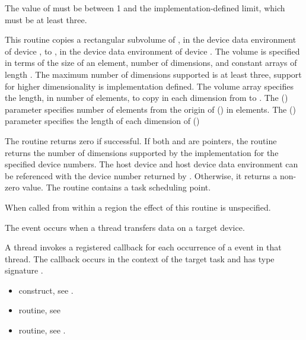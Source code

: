 \begin{ccppspecific}
The value of  must be between 1 and the implementation-defined
limit, which must be at least three.


\effect
This routine copies a rectangular subvolume of ,
in the device data environment of device ,
to , in the device data environment of device .
The volume is specified in terms of the size of an element,
number of dimensions, and constant arrays of length .  The
maximum number of dimensions supported is at least three, support for higher
dimensionality is implementation defined. The volume array specifies the
length, in number of elements, to copy in each dimension from 
to . The  () parameter specifies
number of elements from the origin of  () in elements.
The  () parameter specifies the
length of each dimension of  ()

The routine returns zero if successful. If both  and  are
 pointers, the routine returns the number of dimensions supported
by the implementation for the specified device numbers. The host device and
host device data environment can be referenced with the device number returned
by .  Otherwise, it returns a non-zero value. The
routine contains a task scheduling point.

When called from within a  region
the effect of this routine is unspecified.

\events
The  event occurs when a thread transfers data on a target device.

\tools

A thread invokes a registered 
callback for each occurrence of a  event in that 
thread. The callback occurs in the context of the target task and
has type signature .

\crossreferences
\begin{itemize}
\item {} construct, see .

\item {} routine, see

\item {} routine, see .


\end{itemize}
\end{ccppspecific}
